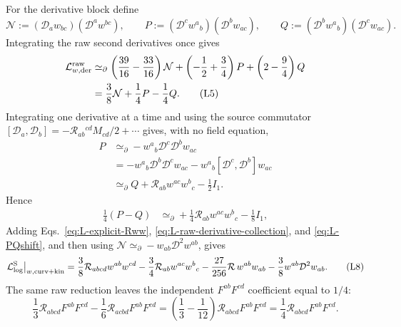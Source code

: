 \documentclass[11pt]{article}
\newcommand{\cL}{\mathcal L}
\newcommand{\cD}{\mathcal D}
\newcommand{\cR}{\mathcal R}
\newcommand{\simeqbd}{\mathrel{\simeq}_{\partial}}
\newcommand{\Log}{\log}
\newcommand{\std}{\mathrm S}
\begin{document}
For the derivative block define
\begin{equation*}
\mathcal N:=(\cD_aw_{bc})(\cD^aw^{bc}),\qquad
P:=(\cD^cw^a{}_b)(\cD^bw_{ac}),\qquad
Q:=(\cD^bw^a{}_b)(\cD^cw_{ac}).
\tag{L4}\label{eq:L-PQ}
\end{equation*}
Integrating the raw second derivatives once gives
\begin{align*}
\cL_{w,\rm der}^{\rm raw}
&\simeqbd
\left(\frac{39}{16}-\frac{33}{16}\right)\mathcal N
+\left(-\frac12+\frac34\right)P
+\left(2-\frac94\right)Q
\nonumber\\
&=\frac38\mathcal N+\frac14P-\frac14Q.
\tag{L5}\label{eq:L-raw-derivative-collection}
\end{align*}
Integrating one derivative at a time and using the source commutator
\(
[\cD_a,\cD_b]=-\cR_{ab}{}^{cd}M_{cd}/2+\cdots
\)
gives, with no field equation,
\begin{align*}
P&\simeqbd-w^a{}_b\cD^c\cD^bw_{ac}
\nonumber\\
&=-w^a{}_b\cD^b\cD^cw_{ac}
-w^a{}_b[\cD^c,\cD^b]w_{ac}
\nonumber\\
&\simeqbd
Q+\cR_{ab}w^{ac}w^b{}_c-\frac12I_1.
\tag{L6}\label{eq:L-PQcomm}
\end{align*}
Hence
\begin{align*}
\frac14(P-Q)
&\simeqbd
+\frac14\cR_{ab}w^{ac}w^b{}_c-\frac18I_1,
\tag{L7}\label{eq:L-PQshift}
\end{align*}
Adding Eqs.~\eqref{eq:L-explicit-Rww},
\eqref{eq:L-raw-derivative-collection}, and \eqref{eq:L-PQshift}, and then
using \(\mathcal N\simeqbd-w_{ab}\cD^2w^{ab}\), gives
\begin{equation*}
\cL_{\Log}^{\std}\big|_{w,\rm curv+kin}
=\frac38\cR_{abcd}w^{ab}w^{cd}
-\frac34\cR_{ab}w^{ac}w^b{}_c
-\frac{27}{256}\cR\,w^{ab}w_{ab}
-\frac38w^{ab}\cD^2w_{ab}.
\tag{L8}\label{eq:L-w-corrected-sector}
\end{equation*}
The same raw reduction leaves the independent \(F^{ab}F^{cd}\) coefficient
equal to \(1/4\):
\begin{equation*}
\frac13\cR_{abcd}F^{ab}F^{cd}
-\frac16\cR_{acbd}F^{ab}F^{cd}
=\left(\frac13-\frac1{12}\right)
\cR_{abcd}F^{ab}F^{cd}
=\frac14\cR_{abcd}F^{ab}F^{cd}.
\tag{L9}\label{eq:L-RFF-quarter}
\end{equation*}
\end{document}
